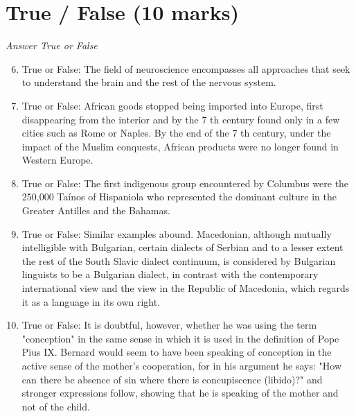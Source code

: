 \documentclass[12pt]{article}
\begin{document}
\section*{True / False (10 marks)}
\textit{Answer True or False}
\begin{enumerate}[label=\arabic*.]
\setcounter{enumi}{5}
\item True or False: The field of neuroscience encompasses all approaches that seek to understand the brain and the rest of the nervous system.
\item True or False: African goods stopped being imported into Europe, first disappearing from the interior and by the 7 th century found only in a few cities such as Rome or Naples. By the end of the 7 th century, under the impact of the Muslim conquests, African products were no longer found in Western Europe.
\item True or False: The first indigenous group encountered by Columbus were the 250,000 Taínos of Hispaniola who represented the dominant culture in the Greater Antilles and the Bahamas.
\item True or False: Similar examples abound. Macedonian, although mutually intelligible with Bulgarian, certain dialects of Serbian and to a lesser extent the rest of the South Slavic dialect continuum, is considered by Bulgarian linguists to be a Bulgarian dialect, in contrast with the contemporary international view and the view in the Republic of Macedonia, which regards it as a language in its own right.
\item True or False: It is doubtful, however, whether he was using the term "conception" in the same sense in which it is used in the definition of Pope Pius IX. Bernard would seem to have been speaking of conception in the active sense of the mother's cooperation, for in his argument he says: "How can there be absence of sin where there is concupiscence (libido)?" and stronger expressions follow, showing that he is speaking of the mother and not of the child.
\end{enumerate}
\end{document}
